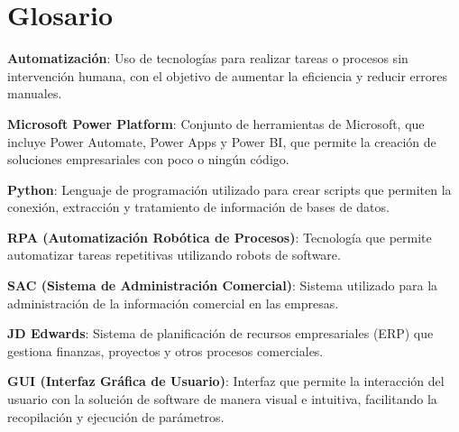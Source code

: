 \documentclass[letter,oneside,12pt,spanish]{report}
\begin{document}
\parskip=12pt
\tableofcontents                    

\newpage

\listoffigures                         %
\newpage
\listoftables
\newpage

\chapter*{Glosario}

\begin{description}

\item \textbf{Automatización}: Uso de tecnologías para realizar tareas o procesos sin intervención humana, con el objetivo de aumentar la eficiencia y reducir errores manuales.
\item \textbf{Microsoft Power Platform}: Conjunto de herramientas de Microsoft, que incluye Power Automate, Power Apps y Power BI, que permite la creación de soluciones empresariales con poco o ningún código.
\item \textbf{Python}: Lenguaje de programación utilizado para crear scripts que permiten la conexión, extracción y tratamiento de información de bases de datos.
\item \textbf{RPA (Automatización Robótica de Procesos)}: Tecnología que permite automatizar tareas repetitivas utilizando robots de software.
\item \textbf{SAC (Sistema de Administración Comercial)}: Sistema utilizado para la administración de la información comercial en las empresas.
\item \textbf{JD Edwards}: Sistema de planificación de recursos empresariales (ERP) que gestiona finanzas, proyectos y otros procesos comerciales.
\item \textbf{GUI (Interfaz Gráfica de Usuario)}: Interfaz que permite la interacción del usuario con la solución de software de manera visual e intuitiva, facilitando la recopilación y ejecución de parámetros.


\end{description}


\newpage

\newpage
\end{document}
